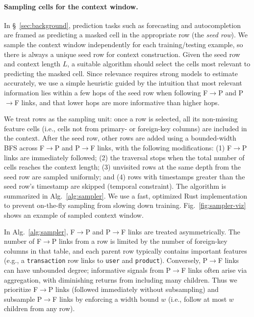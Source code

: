 \paragraph{Sampling cells for the context window.}
In \S~\ref{sec:background}, prediction tasks such as forecasting and autocompletion are framed as predicting a masked cell in the appropriate row (the \emph{seed row}). We sample the context window independently for each training/testing example, so there is always a unique seed row for context construction. Given the seed row and context length $L$, a suitable algorithm should select the cells most relevant to predicting the masked cell. Since relevance requires strong models to estimate accurately, we use a simple heuristic guided by the intuition that most relevant information lies within a few hops of the seed row when following F$\to$P and P$\to$F links, and that lower hops are more informative than higher hops.

We treat rows as the sampling unit: once a row is selected, all its non-missing feature cells (i.e., cells not from primary- or foreign-key columns) are included in the context. After the seed row, other rows are added using a bounded-width BFS across F$\to$P and P$\to$F links, with the following modifications: (1) F$\to$P links are immediately followed; (2) the traversal stops when the total number of cells reaches the context length; (3) unvisited rows at the same depth from the seed row are sampled uniformly; and (4) rows with timestamps greater than the seed row's timestamp are skipped (temporal constraint). The algorithm is summarized in Alg.~\ref{alg:sampler}. We use a fast, optimized Rust implementation to prevent on-the-fly sampling from slowing down training. Fig.~\ref{fig:sampler-viz} shows an example of sampled context window.

In Alg.~\ref{alg:sampler}, F$\to$P and P$\to$F links are treated asymmetrically. The number of F$\to$P links from a row is limited by the number of foreign-key columns in that table, and each parent row typically contains important features (e.g., a \texttt{transaction} row links to \texttt{user} and \texttt{product}). Conversely, P$\to$F links can have unbounded degree; informative signals from P$\to$F links often arise via aggregation, with diminishing returns from including many children. Thus we prioritize F$\to$P links (followed immediately without subsampling) and subsample P$\to$F links by enforcing a width bound $w$ (i.e., follow at most $w$ children from any row).



